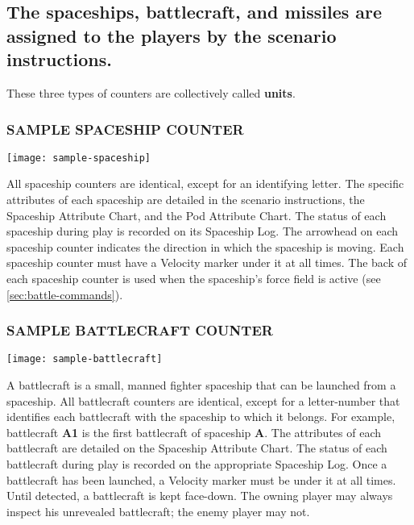 \subsection[Unit Assignment]{The spaceships, battlecraft, and missiles
  are assigned to 
  the players by the scenario instructions.}
\label{sec:unit-assignment}

These three types of counters are collectively called \textbf{units}. 


\subsubsection*{SAMPLE SPACESHIP COUNTER}

\texttt{[image: sample-spaceship]}

\medskip

All spaceship counters are identical, except for an identifying
letter. The specific attributes of each spaceship are detailed in the
scenario instructions, the Spaceship Attribute Chart, and the Pod
Attribute Chart. The status of each spaceship during play is recorded
on its Spaceship Log. The arrowhead on each spaceship counter
indicates the direction in which the spaceship is moving. Each
spaceship counter must have a Velocity marker under it at all times.
The back of each spaceship counter is used when the spaceship's
force field is active (see \ref{sec:battle-commands}).


\subsubsection*{SAMPLE BATTLECRAFT COUNTER}

\texttt{[image: sample-battlecraft]}

\medskip

A battlecraft is a small, manned fighter spaceship that can be
launched from a spaceship. All battlecraft counters are identical,
except for a letter-number that identifies each battlecraft with the
spaceship to which it belongs. For example, battlecraft \textbf{A1}
is the first battlecraft of spaceship \textbf{A}. The attributes of each
battlecraft are detailed on the Spaceship Attribute Chart. The status
of each battlecraft during play is recorded on the appropriate
Spaceship Log. Once a battlecraft has been launched, a Velocity
marker must be under it at all times. Until detected, a battlecraft is
kept face-down. The owning player may always inspect his unrevealed
battlecraft; the enemy player may not.


